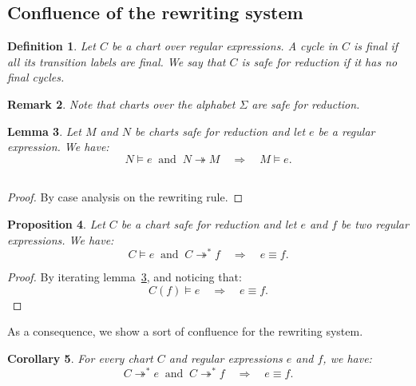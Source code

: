 \documentclass{article}
\newtheorem{definition}{Definition}[section]
\newtheorem{lemma}[definition]{Lemma}
\newtheorem{proposition}[definition]{Proposition}
\newtheorem{corollary}[definition]{Corollary}
\newtheorem{remark}[definition]{Remark}
\newcommand{\milner}[1]{M(#1)}
\begin{document}
  
  
  
  
  \subsection{Confluence of the rewriting system}\label{sec:confluence-of-rewriting-system}
  
    \begin{definition} Let $C$ be a chart over regular expressions.
   A cycle in $C$ is \emph{final} if all its transition labels are final. We say that $C$ is \emph{safe for reduction} if it has no final cycles.
   \end{definition}
  
   \begin{remark} Note that charts over the alphabet $\Sigma$ are safe for reduction.
   \end{remark}
  
   
    \begin{lemma} Let $M$ and $N$ be charts safe for reduction and let $e$ be a regular expression. We have:
      \[  N \models e  \ \text{ and }\  N \twoheadrightarrow M\quad \Longrightarrow\quad M \models e.\] ~\label{lem:stable-by-red}
    \end{lemma}
  \begin{proof}
    By case analysis on the rewriting rule.
  \end{proof}
  
  
  \begin{proposition}\label{prop:labeling-unique} Let $C$ be a chart safe for reduction and let $e$ and $f$ be two regular expressions. We have:
   \[ C \models e\ \text{ and }\  C\twoheadrightarrow^* f\quad \Longrightarrow\quad e\equiv f.\] 
  \end{proposition}
  \begin{proof} 
  By iterating lemma~\ref{lem:stable-by-red}, and noticing that:
   \[C(f)\models e\quad \Rightarrow \quad e\equiv f.\]\vspace{-10pt}
  \end{proof}
  
  As a consequence, we show a sort of confluence for the rewriting system.
  \begin{corollary} For every chart $C$ and regular expressions $e$ and $f$, we have:
    \[ C \twoheadrightarrow^* e\ \text{ and }\  C\twoheadrightarrow^* f\quad \Longrightarrow\quad e\equiv f.\]
    \label{cor:confluence}
  \end{corollary}
  
\end{document}
